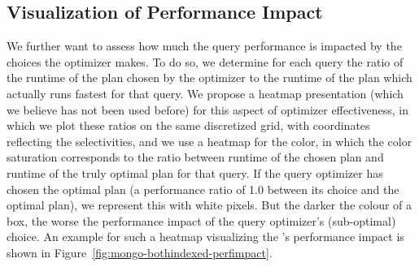 %
%



\subsection{Visualization of Performance Impact}
We further want to assess how much the query performance is impacted by the choices the optimizer makes. To do so, we determine for each query the ratio of the runtime of the plan chosen by the optimizer to the runtime of the plan which actually runs fastest for that query. We propose a heatmap presentation (which we believe has not been used before) for this aspect of optimizer effectiveness, in which we plot these ratios on the same discretized grid, with coordinates reflecting the selectivities, and we use a heatmap for the color, in which the color saturation  corresponds to the ratio between runtime of the chosen plan and runtime of the truly optimal plan for that query. 
If the query optimizer has chosen the optimal plan (a performance ratio of 1.0 between its choice and the optimal plan), we represent this with white pixels. 
But the darker the colour of a box, the worse the performance impact of the query optimizer's (sub-optimal) choice.
An example for such a heatmap visualizing the \approachName's performance impact is shown in Figure~\ref{fig:mongo-bothindexed-perfimpact}.


